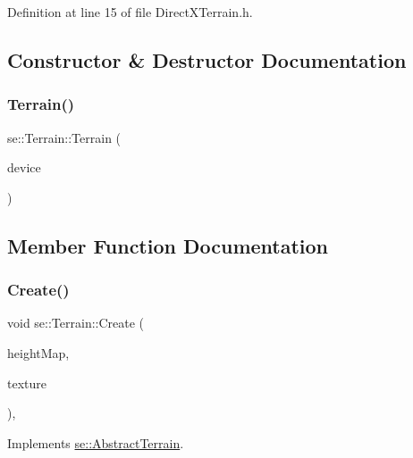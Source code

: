 Definition at line 15 of file Direct\+X\+Terrain.\+h.



\subsection{Constructor \& Destructor Documentation}
\mbox{\label{classse_1_1_terrain_aba0253655814ae0fab2b1145e2a4e3d2}} 
\subsubsection{\texorpdfstring{Terrain()}{Terrain()}}
{\footnotesize\ttfamily se\+::\+Terrain\+::\+Terrain (\begin{DoxyParamCaption}\item[{L\+P\+D\+I\+R\+E\+C\+T3\+D\+D\+E\+V\+I\+C\+E9}]{device }\end{DoxyParamCaption})}



\subsection{Member Function Documentation}
\mbox{\label{classse_1_1_terrain_aa4faf6049af59a776a2464175e62ff08}} 
\subsubsection{\texorpdfstring{Create()}{Create()}}
{\footnotesize\ttfamily void se\+::\+Terrain\+::\+Create (\begin{DoxyParamCaption}\item[{const std\+::string \&}]{height\+Map,  }\item[{const std\+::string \&}]{texture }\end{DoxyParamCaption})\hspace{0.3cm}{\ttfamily [override]}, {\ttfamily [virtual]}}



Implements \mbox{\hyperlink{classse_1_1_abstract_terrain_ac8254489e68bcfc1960b968afeb683b0}{se\+::\+Abstract\+Terrain}}.

\mbox{\label{classse_1_1_terrain_aa4eeb1886f46d2f33e1633b6f7c7345c}} 
